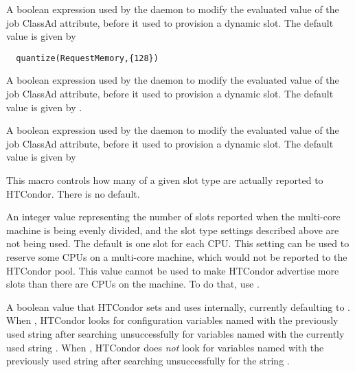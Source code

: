\begin{description}
\label{param:ModifyRequestExprRequestmemory}
\item[\Macro{MODIFY\_REQUEST\_EXPR\_REQUESTMEMORY}]
  A boolean expression used by the  daemon to modify the
  evaluated value of the  job ClassAd attribute,
  before it used to provision a dynamic slot. 
  The default value is given by
  \footnotesize
  \begin{verbatim}
  quantize(RequestMemory,{128})
  \end{verbatim}
  \normalsize

\label{param:ModifyRequestExprRequestdisk}
\item[\Macro{MODIFY\_REQUEST\_EXPR\_REQUESTDISK}]
  A boolean expression used by the  daemon to modify the
  evaluated value of the  job ClassAd attribute,
  before it used to provision a dynamic slot. 
  The default value is given by
  .

\label{param:ModifyRequestExprRequestcpus}
\item[\Macro{MODIFY\_REQUEST\_EXPR\_REQUESTCPUS}]
  A boolean expression used by the  daemon to modify the
  evaluated value of the  job ClassAd attribute,
  before it used to provision a dynamic slot. 
  The default value is given by

\label{param:NumSlotsTypeN}
\item[\Macro{NUM\_SLOTS\_TYPE\_<N>}]
  This macro controls how many of a given slot type
  are actually reported to HTCondor.
  There is no default.

\label{param:NumSlots}
\item[\Macro{NUM\_SLOTS}]
  An integer value representing the number of slots reported when
  the multi-core machine is being evenly divided, and the slot
  type settings described above are not being used.
  The default is one slot for each CPU.
  This setting can be used to reserve some CPUs on a multi-core machine,
  which would
  not be reported to the HTCondor pool.
  This value cannot be used to
  make HTCondor advertise more slots than there are CPUs on the machine.
  To do that, use .

\label{param:AllowVMCruft}
\item[\Macro{ALLOW\_VM\_CRUFT}]
  A boolean value that HTCondor sets and uses internally, currently
  defaulting to .  When ,
  HTCondor looks for configuration variables named with the
  previously used string  after searching unsuccessfully
  for variables named with the currently used string .
  When , HTCondor does \emph{not} look for variables named
  with the previously used string  after searching
  unsuccessfully for the string . 

\end{description}


